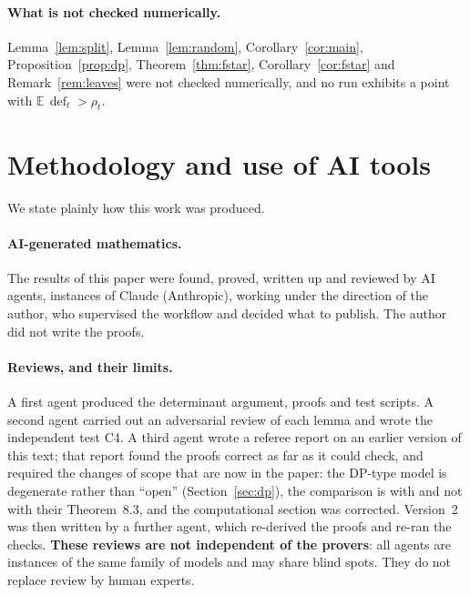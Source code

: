 \documentclass[11pt,a4paper]{article}
\theoremstyle{definition}
\theoremstyle{remark}
\newcommand{\E}{\mathbb{E}}
\newcommand{\dfc}{\operatorname{def}}
\begin{document}
\paragraph{What is not checked numerically.} Lemma~\ref{lem:split},
Lemma~\ref{lem:random}, Corollary~\ref{cor:main}, Proposition~\ref{prop:dp},
Theorem~\ref{thm:fstar}, Corollary~\ref{cor:fstar} and Remark~\ref{rem:leaves} were not
checked numerically, and no run exhibits a point with
$\E\,\dfc_t>\rho_t$.

\section{Methodology and use of AI tools}\label{sec:ai}

We state plainly how this work was produced.

\paragraph{AI-generated mathematics.} The results of this paper were found, proved, written
up and reviewed by AI agents, instances of Claude (Anthropic), working under the direction of
the author, who supervised the workflow and decided what to publish. The author did not
write the proofs.

\paragraph{Reviews, and their limits.} A first agent produced the determinant argument,
proofs and test scripts. A second agent carried out an adversarial review of each lemma and
wrote the independent test C4. A third agent wrote a referee report on an earlier version of
this text; that report found the proofs correct as far as it could check, and required the
changes of scope that are now in the paper: the DP-type model is degenerate rather than
``open'' (Section~\ref{sec:dp}), the comparison is with \cite[Theorem~8.1 and Lemma~8.2]{DL}
and not with their Theorem~8.3, and the computational section was corrected. Version~2
was then written by a further agent, which re-derived the proofs and re-ran the checks.
\textbf{These reviews are not independent of the provers}: all agents are instances of the
same family of models and may share blind spots. They do not replace review by human
experts.
\end{document}
